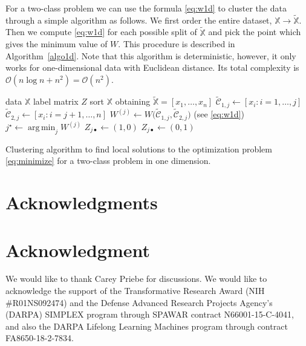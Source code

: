 \documentclass[10pt,journal,compsoc]{IEEEtran}
\DeclareMathOperator*{\argmin}{arg\,min}
\newcommand\C{{\mathcal{C}}}
\newcommand\tC{{\widetilde{\C}}}
\newcommand\OO{{\mathcal{O}}}
\begin{document}
For a two-class problem we can use the formula
\eqref{eq:w1d} to cluster the data
through a simple algorithm
as follows. We first order
the entire dataset, $\mathbb{X} \to \widetilde{\mathbb{X}}$. Then
we compute \eqref{eq:w1d} for each possible split of $\widetilde{\mathbb{X}}$
and pick the point which gives the minimum value of $W$.
This procedure is described in Algorithm~\ref{algo1d}.
Note that this algorithm is deterministic,
however,
it only works for one-dimensional data with Euclidean distance. Its total
complexity is $\OO(n\log n + n^2) = \OO(n^2)$.


\begin{algorithm}[h]
\vspace{.5em}
\begin{algorithmic}[1]
\INPUT data $\mathbb{X}$
\OUTPUT label matrix $Z$
\STATE sort $\mathbb{X}$ obtaining
$\widetilde{\mathbb{X}}= [ x_1,\dotsc,x_n ]$
        \STATE $\tC_{1,j} \leftarrow [x_i: i=1,\dotsc,j]$
        \STATE $\tC_{2,j} \leftarrow [x_i : i=j+1,\dotsc,n]$
        \STATE
            $W^{(j)} \leftarrow W \big( \tC_{1,j},\tC_{2,j}\big)$
            \hfill (see \eqref{eq:w1d})
    \ENDFOR
    \STATE $j^\star \leftarrow \argmin_j W^{(j)}$
    		\STATE $Z_{j\bullet} \leftarrow (1,0) $
        \ELSE
			\STATE $Z_{j\bullet} \leftarrow (0,1)$
		\ENDIF
	\ENDFOR
\end{algorithmic}
\caption{
\label{algo1d}
Clustering algorithm to
find local solutions to the optimization
problem \eqref{eq:minimize}
for a two-class problem in one dimension. 
}
\end{algorithm}



\ifCLASSOPTIONcompsoc
  \section*{Acknowledgments}
\else
  \section*{Acknowledgment}
\fi

We would like to thank Carey Priebe for discussions.
We would like to acknowledge the support of the Transformative
Research Award (NIH \#R01NS092474) and  the Defense Advanced Research Projects
Agency’s (DARPA) SIMPLEX program through SPAWAR contract N66001-15-C-4041,
and also the 
DARPA Lifelong Learning Machines program through contract FA8650-18-2-7834.
\end{document}
